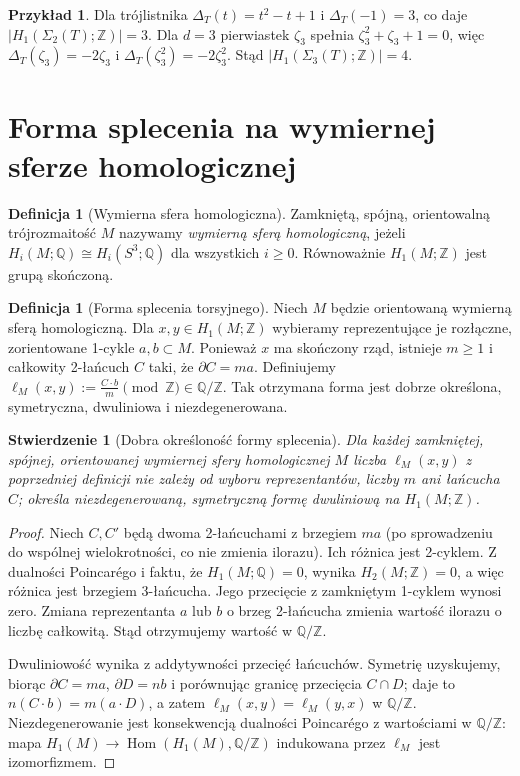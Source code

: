 \documentclass[11pt,a4paper]{report}
\numberwithin{equation}{section}
\theoremstyle{plain}
\newtheorem{stwierdzenie}[twierdzenie]{Stwierdzenie}
\theoremstyle{definition}
\newtheorem{definicja}[twierdzenie]{Definicja}
\newtheorem{przyklad}[twierdzenie]{Przykład}
\theoremstyle{remark}
\begin{document}
\begin{przyklad}
Dla trójlistnika $\Delta_T(t)=t^2-t+1$ i
$\Delta_T(-1)=3$, co daje
$|H_1(\Sigma_2(T);\mathbb Z)|=3$.
Dla $d=3$ pierwiastek $\zeta_3$ spełnia
$\zeta_3^2+\zeta_3+1=0$, więc
$\Delta_T(\zeta_3)=-2\zeta_3$ i
$\Delta_T(\zeta_3^2)=-2\zeta_3^2$.
Stąd $|H_1(\Sigma_3(T);\mathbb Z)|=4$.
\end{przyklad}

\section{Forma splecenia na wymiernej sferze homologicznej}
\label{sec:kt-linking-pairing}

\begin{definicja}[Wymierna sfera homologiczna]
Zamkniętą, spójną, orientowalną trójrozmaitość $M$
nazywamy \emph{wymierną sferą homologiczną}, jeżeli
$H_i(M;\mathbb Q)\cong H_i(S^3;\mathbb Q)$
dla wszystkich $i\geq0$. Równoważnie $H_1(M;\mathbb Z)$
jest grupą skończoną.
\end{definicja}

\begin{definicja}[Forma splecenia torsyjnego]
Niech $M$ będzie orientowaną wymierną sferą homologiczną.
Dla $x,y\in H_1(M;\mathbb Z)$ wybieramy reprezentujące
je rozłączne, zorientowane 1-cykle $a,b\subset M$.
Ponieważ $x$ ma skończony rząd, istnieje $m\geq1$
i całkowity 2-łańcuch $C$ taki, że $\partial C=ma$.
Definiujemy
$\ell_M(x,y):=\frac{C\cdot b}{m}\pmod{\mathbb Z}
\in\mathbb Q/\mathbb Z$.
Tak otrzymana forma jest dobrze określona, symetryczna,
dwuliniowa i niezdegenerowana.
\end{definicja}

\begin{stwierdzenie}[Dobra określoność formy splecenia]
Dla każdej zamkniętej, spójnej, orientowanej wymiernej
sfery homologicznej $M$ liczba $\ell_M(x,y)$ z poprzedniej
definicji nie zależy od wyboru reprezentantów, liczby $m$
ani łańcucha $C$; określa niezdegenerowaną, symetryczną
formę dwuliniową na $H_1(M;\mathbb Z)$.
\end{stwierdzenie}

\begin{proof}
Niech $C,C'$ będą dwoma 2-łańcuchami z brzegiem
$m a$ (po sprowadzeniu do wspólnej wielokrotności,
co nie zmienia ilorazu). Ich różnica jest 2-cyklem.
Z dualności Poincarégo i faktu, że $H_1(M;\mathbb Q)=0$,
wynika $H_2(M;\mathbb Z)=0$, a więc różnica jest
brzegiem 3-łańcucha. Jego przecięcie z zamkniętym
1-cyklem wynosi zero. Zmiana reprezentanta $a$ lub $b$
o brzeg 2-łańcucha zmienia wartość ilorazu o liczbę
całkowitą. Stąd otrzymujemy wartość w $\mathbb Q/\mathbb Z$.

Dwuliniowość wynika z addytywności przecięć łańcuchów.
Symetrię uzyskujemy, biorąc $\partial C=ma$,
$\partial D=nb$ i porównując granicę przecięcia
$C\cap D$; daje to $n(C\cdot b)=m(a\cdot D)$,
a zatem $\ell_M(x,y)=\ell_M(y,x)$ w $\mathbb Q/\mathbb Z$.
Niezdegenerowanie jest konsekwencją dualności
Poincarégo z wartościami w $\mathbb Q/\mathbb Z$:
mapa $H_1(M)\to\operatorname{Hom}(H_1(M),\mathbb Q/\mathbb Z)$
indukowana przez $\ell_M$ jest izomorfizmem.
\end{proof}
\end{document}
